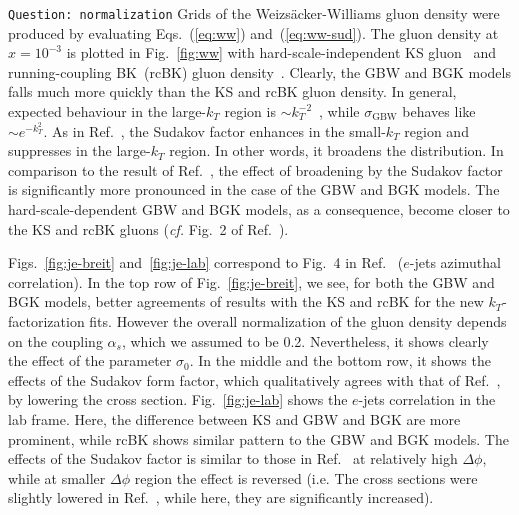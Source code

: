 \documentclass[11pt]{article}
\numberwithin{equation}{section}
\numberwithin{table}{section}
\numberwithin{figure}{section}
\newcommand{\comment}[1]{\texttt{\color{red}#1}}
\begin{document}
\comment{Question: normalization}
Grids of the Weizs\"acker-Williams gluon density were produced by evaluating Eqs.~(\ref{eq:ww}) and~(\ref{eq:ww-sud}).
The gluon density at $x=10^{-3}$ is plotted in Fig.~\ref{fig:ww} with hard-scale-independent KS gluon~\cite{vanHameren:2021sqc,Abdulov:2021ivr} and running-coupling BK~(rcBK) gluon density~\cite{}. Clearly, the GBW and BGK models falls much more quickly than the KS and rcBK gluon density. In general, expected behaviour in the large-$k_T$ region is $\sim k_T^{-2}$~\cite{Dominguez:2010xd,Dominguez:2011wm}, while $\sigma_{\mathrm{GBW}}$ behaves like $\sim e^{-k_T^2}$.
As in Ref.~\cite{vanHameren:2021sqc}, the Sudakov factor enhances in the small-$k_T$ region and suppresses in the large-$k_T$ region. In other words, it broadens the distribution. In comparison to the result of Ref.~\cite{vanHameren:2021sqc}, the effect of broadening by the Sudakov factor is significantly more pronounced in the case of the GBW and BGK models. The hard-scale-dependent GBW and BGK models, as a consequence, become closer to the KS and rcBK gluons (\textit{cf.} Fig.~2 of Ref.~\cite{vanHameren:2021sqc}).  

Figs.~\ref{fig:je-breit} and~\ref{fig:je-lab} correspond to Fig.~4 in Ref.~\cite{vanHameren:2021sqc} ($e$-jets azimuthal correlation). 
In the top row of Fig.~\ref{fig:je-breit}, we see, for both the GBW and BGK models, better agreements of results with the KS and rcBK for the new $k_T$-factorization fits. However the overall normalization of the gluon density depends on the coupling $\alpha_s$, which we assumed to be 0.2. Nevertheless, it shows clearly the effect of the parameter $\sigma_0$. In the middle and the bottom row, it shows the effects of the Sudakov form factor, which qualitatively agrees with that of Ref.~\cite{vanHameren:2021sqc}, by lowering the cross section.
Fig.~\ref{fig:je-lab} shows the $e$-jets correlation in the lab frame. Here, the difference between KS and GBW and BGK are more prominent, while rcBK shows similar pattern to the GBW and BGK models. %
The effects of the Sudakov factor is similar to those in Ref.~\cite{vanHameren:2021sqc} at relatively high $\Delta \phi$, while at smaller $\Delta \phi$ region the effect is reversed (i.e. The cross sections were slightly lowered in Ref.~\cite{vanHameren:2021sqc}, while here, they are significantly increased). \\
\end{document}
